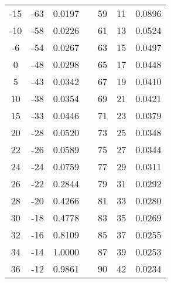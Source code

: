\begin{table}[!htb]
\begin{tabular}{cccl|l|l|c|}
\multicolumn{1}{|c|}{-15} & \multicolumn{1}{c|}{-63} & \multicolumn{1}{c|}{0.0197} &  & 59 & 11 & 0.0896 \\ \cline{1-3} \cline{5-7} 
\multicolumn{1}{|c|}{-10} & \multicolumn{1}{c|}{-58} & \multicolumn{1}{c|}{0.0226} &  & 61 & 13 & 0.0524 \\ \cline{1-3} \cline{5-7} 
\multicolumn{1}{|c|}{-6} & \multicolumn{1}{c|}{-54} & \multicolumn{1}{c|}{0.0267} &  & 63 & 15 & 0.0497 \\ \cline{1-3} \cline{5-7} 
\multicolumn{1}{|c|}{0} & \multicolumn{1}{c|}{-48} & \multicolumn{1}{c|}{0.0298} &  & 65 & 17 & 0.0448 \\ \cline{1-3} \cline{5-7} 
\multicolumn{1}{|c|}{5} & \multicolumn{1}{c|}{-43} & \multicolumn{1}{c|}{0.0342} &  & 67 & 19 & 0.0410 \\ \cline{1-3} \cline{5-7} 
\multicolumn{1}{|c|}{10} & \multicolumn{1}{c|}{-38} & \multicolumn{1}{c|}{0.0354} &  & 69 & 21 & 0.0421 \\ \cline{1-3} \cline{5-7} 
\multicolumn{1}{|c|}{15} & \multicolumn{1}{c|}{-33} & \multicolumn{1}{c|}{0.0446} &  & 71 & 23 & 0.0379 \\ \cline{1-3} \cline{5-7} 
\multicolumn{1}{|c|}{20} & \multicolumn{1}{c|}{-28} & \multicolumn{1}{c|}{0.0520} &  & 73 & 25 & 0.0348 \\ \cline{1-3} \cline{5-7} 
\multicolumn{1}{|c|}{22} & \multicolumn{1}{c|}{-26} & \multicolumn{1}{c|}{0.0589} &  & 75 & 27 & 0.0344 \\ \cline{1-3} \cline{5-7} 
\multicolumn{1}{|c|}{24} & \multicolumn{1}{c|}{-24} & \multicolumn{1}{c|}{0.0759} &  & 77 & 29 & 0.0311 \\ \cline{1-3} \cline{5-7} 
\multicolumn{1}{|c|}{26} & \multicolumn{1}{c|}{-22} & \multicolumn{1}{c|}{0.2844} &  & 79 & 31 & 0.0292 \\ \cline{1-3} \cline{5-7} 
\multicolumn{1}{|c|}{28} & \multicolumn{1}{c|}{-20} & \multicolumn{1}{c|}{0.4266} &  & 81 & 33 & 0.0280 \\ \cline{1-3} \cline{5-7} 
\multicolumn{1}{|c|}{30} & \multicolumn{1}{c|}{-18} & \multicolumn{1}{c|}{0.4778} &  & 83 & 35 & 0.0269 \\ \cline{1-3} \cline{5-7} 
\multicolumn{1}{|c|}{32} & \multicolumn{1}{c|}{-16} & \multicolumn{1}{c|}{0.8109} &  & 85 & 37 & 0.0255 \\ \cline{1-3} \cline{5-7} 
\multicolumn{1}{|c|}{34} & \multicolumn{1}{c|}{-14} & \multicolumn{1}{c|}{1.0000} &  & 87 & 39 & 0.0253 \\ \cline{1-3} \cline{5-7} 
\multicolumn{1}{|c|}{36} & \multicolumn{1}{c|}{-12} & \multicolumn{1}{c|}{0.9861} &  & 90 & 42 & 0.0234 \\ \cline{1-3} \cline{5-7} 

\end{tabular}
\end{table}
